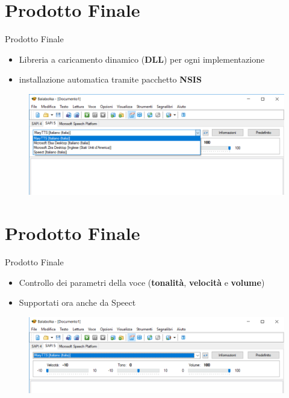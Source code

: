 \documentclass{beamer}
\begin{document}
\section{Prodotto Finale}
\begin{frame}{Prodotto Finale}
	\begin{itemize}
		\item Libreria a caricamento dinamico (\textbf{DLL}) per ogni implementazione
		\item installazione automatica tramite pacchetto \textbf{NSIS}
	\end{itemize}
	\begin{figure}[H]
		\includegraphics[width=\textwidth]{images/prodotto-finale}
	\end{figure}
\end{frame}

\section{Prodotto Finale}
\begin{frame}{Prodotto Finale}
	\begin{itemize}
		\item Controllo dei parametri della voce  (\textbf{tonalità}, \textbf{velocità} e 
	    \textbf{volume})
		\item Supportati ora anche da Speect 
	\end{itemize}
	\begin{figure}[H]
		\includegraphics[width=\textwidth]{images/prodotto-finale-2}
	\end{figure}
\end{frame}
\end{document}
